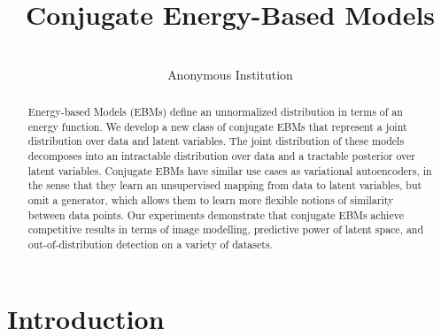 \documentclass[tablecaption=bottom,wcp]{jmlr} %
\title[Conjugate Energy-Based Models]{Conjugate Energy-Based Models}
\author{\Name{Anonymous Authors}\\
  \addr Anonymous Institution}
\begin{document}
\maketitle

\begin{abstract}
Energy-based Models (EBMs) define an unnormalized distribution in terms of an energy function. We develop a new class of conjugate EBMs that represent a joint distribution over data and latent variables. The joint distribution of these models decomposes into an intractable distribution over data and a tractable posterior over latent variables. Conjugate EBMs have similar use cases as variational autoencoders, in the sense that they learn an unsupervised mapping from data to latent variables, but omit a generator, which allows them to learn more flexible notions of similarity between data points. Our experiments demonstrate that conjugate EBMs achieve competitive results in terms of image modelling, predictive power of latent space, and out-of-distribution detection on a variety of datasets. \end{abstract}


\section{Introduction}
\label{sec:intro}


\end{document}
